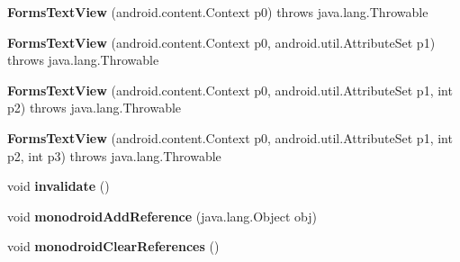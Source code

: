 \begin{DoxyCompactItemize}
\item 
\mbox{\label{classmd5b60ffeb829f638581ab2bb9b1a7f4f3f_1_1_forms_text_view_aafad6c761c1d359ba5d9ba2e7d58f6a6}} 
{\bfseries Forms\+Text\+View} (android.\+content.\+Context p0)  throws java.\+lang.\+Throwable 	
\item 
\mbox{\label{classmd5b60ffeb829f638581ab2bb9b1a7f4f3f_1_1_forms_text_view_a7d3c80cbb7333b06cbafacf194ac26ec}} 
{\bfseries Forms\+Text\+View} (android.\+content.\+Context p0, android.\+util.\+Attribute\+Set p1)  throws java.\+lang.\+Throwable 	
\item 
\mbox{\label{classmd5b60ffeb829f638581ab2bb9b1a7f4f3f_1_1_forms_text_view_a9cd58a7bb5d5ce0c7076ae35404b2138}} 
{\bfseries Forms\+Text\+View} (android.\+content.\+Context p0, android.\+util.\+Attribute\+Set p1, int p2)  throws java.\+lang.\+Throwable 	
\item 
\mbox{\label{classmd5b60ffeb829f638581ab2bb9b1a7f4f3f_1_1_forms_text_view_a2900a37d92cd0ef85a4290ae3b6bf3d9}} 
{\bfseries Forms\+Text\+View} (android.\+content.\+Context p0, android.\+util.\+Attribute\+Set p1, int p2, int p3)  throws java.\+lang.\+Throwable 	
\item 
\mbox{\label{classmd5b60ffeb829f638581ab2bb9b1a7f4f3f_1_1_forms_text_view_a93c3c0adf589f26fea5031e1e9b484c3}} 
void {\bfseries invalidate} ()
\item 
\mbox{\label{classmd5b60ffeb829f638581ab2bb9b1a7f4f3f_1_1_forms_text_view_a20925dbf92ee998bfae5cc3aca483f3a}} 
void {\bfseries monodroid\+Add\+Reference} (java.\+lang.\+Object obj)
\item 
\mbox{\label{classmd5b60ffeb829f638581ab2bb9b1a7f4f3f_1_1_forms_text_view_aae0338a9a14411e891317f37a37f4f58}} 
void {\bfseries monodroid\+Clear\+References} ()
\end{DoxyCompactItemize}
